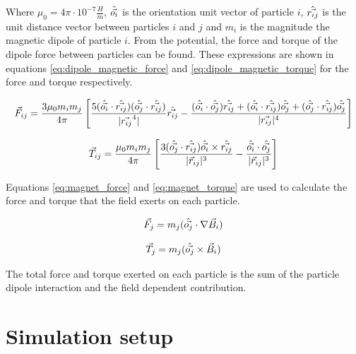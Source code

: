 Where $\mu_0 = 4\pi \cdot 10^{-7} \frac{H}{m}$,  $\Hat{\vec{o_i}}$ is the orientation unit vector of particle 
$i$, $\Hat{\vec{r_{ij}}}$ is the unit distance vector between particles $i$ and $j$ and $m_i$ is the magnitude the 
magnetic dipole of particle $i$. From the potential, the force and torque of the dipole force between particles 
can be found. These expressions are shown in equations \ref{eq:dipole_magnetic_force} and \ref{eq:dipole_magnetic_torque} 
for the force and torque respectively.

\begin{equation}
    \vec{F}_{ij} = \frac{3 \mu_0 m_i m_j}{4 \pi} \left[ \frac{5( \Hat{\vec{o_i}} \cdot \Hat{\vec{r_{ij}}} )(\Hat{\vec{o_j}}
    \cdot \Hat{\vec{r_{ij}}})}{|\vec{r_{ij}}^4|}\Hat{\vec{r_{ij}}} - \frac{(\Hat{\vec{o_i}} \cdot \Hat{\vec{o_j}})\Hat{\vec{r_{ij}}} + 
    (\Hat{\vec{o_i}} \cdot \Hat{\vec{r_{ij}}})\Hat{\vec{o_j}} + (\Hat{\vec{o_j}} \cdot \Hat{\vec{r_{ij}}})\Hat{\vec{o_j}} }{|\vec{r_{ij}}|^4} \right]
\label{eq:dipole_magnetic_force}
\end{equation}

\begin{equation}
    \vec{T}_{ij} = \frac{\mu_0 m_i m_j}{4 \pi}\left[ \frac{3(\Hat{\vec{o_j}} \cdot \Hat{\vec{r_{ij}}})\Hat{\vec{o_i}} \times \Hat{\vec{r_{ij}}} }
    {|\vec{r}_{ij}|^3} - \frac{\Hat{\vec{o_i}} \cdot \Hat{\vec{o_j}} }{|\vec{r}_{ij}|^3}\right]
    \label{eq:dipole_magnetic_torque}
\end{equation}

Equations \ref{eq:magnet_force} and \ref{eq:magnet_torque} are used to calculate the force and torque that the 
field exerts on each particle.

\begin{equation}
    \vec{F}_{j} = m_j(\Hat{\vec{o_j}} \cdot \nabla \vec{B}_{i})
    \label{eq:magnet_force}
\end{equation}

\begin{equation}
    \vec{T}_{j} = m_j(\Hat{\vec{o_j}} \times \vec{B}_{i})
    \label{eq:magnet_torque}
\end{equation}

The total force and torque exerted on each particle is the sum of the particle dipole interaction and the field 
dependent contribution. 

\section{Simulation setup}
\label{section:sim_setup}

